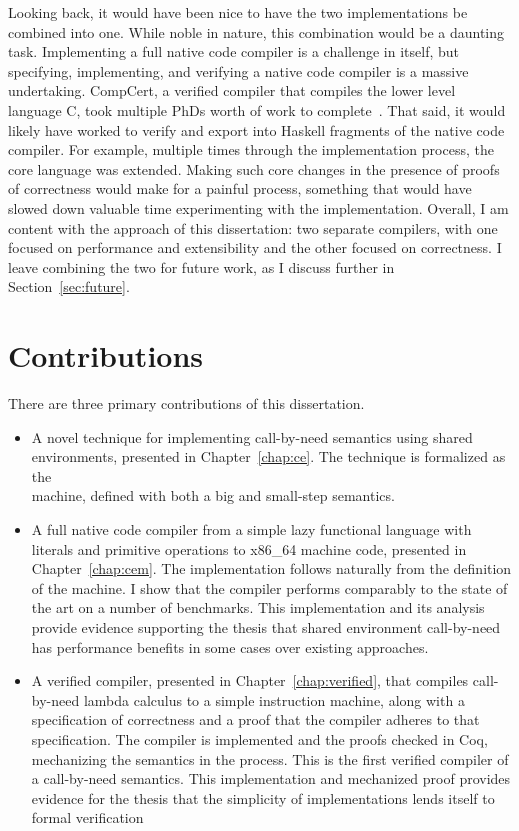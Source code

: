 Looking back, it would have been nice to have the two implementations be
combined into one. While noble in nature, this combination would be a daunting
task. Implementing a full native code compiler is a challenge in itself, but
specifying, implementing, and verifying a native code compiler is a massive
undertaking. CompCert, a verified compiler that compiles the lower level
language C, took multiple PhDs worth of work to
complete~\cite{leroy2012compcert}. That said, it would likely have worked to
verify and export into Haskell fragments of the native code compiler.  For
example, multiple times through the implementation process, the core language
was extended. Making such core changes in the presence of proofs of correctness
would make for a painful process, something that would have slowed down valuable
time experimenting with the implementation. Overall, I am content with the
approach of this dissertation: two separate compilers, with one focused on
performance and extensibility and the other focused on correctness. I leave
combining the two for future work, as I discuss further in
Section~\ref{sec:future}.

\section{Contributions}

There are three primary contributions of this dissertation.

\begin{itemize}
\item A novel technique for implementing call-by-need semantics using shared
environments, presented in Chapter~\ref{chap:ce}. The technique is formalized as
the \ce \\ machine, defined with both a big and small-step semantics.

\item A full native code compiler from a simple lazy functional language with
literals and primitive operations to x86\_64 machine code, presented in
Chapter~\ref{chap:cem}. The implementation follows naturally from the definition
of the \ce machine. I show that the compiler performs comparably to the state of
the art on a number of benchmarks.  This implementation and its analysis provide
evidence supporting the thesis that shared environment call-by-need has
performance benefits in some cases over existing approaches.

\item A verified compiler, presented in Chapter~\ref{chap:verified}, that
compiles call-by-need lambda calculus to a simple instruction machine, along
with a specification of correctness and a proof that the compiler adheres to
that specification. The compiler is implemented and the proofs checked in Coq,
mechanizing the \ce semantics in the process. This is the first verified
compiler of a call-by-need semantics. This implementation and mechanized proof
provides evidence for the thesis that the simplicity of \ce implementations
lends itself to formal verification 
\end{itemize}

